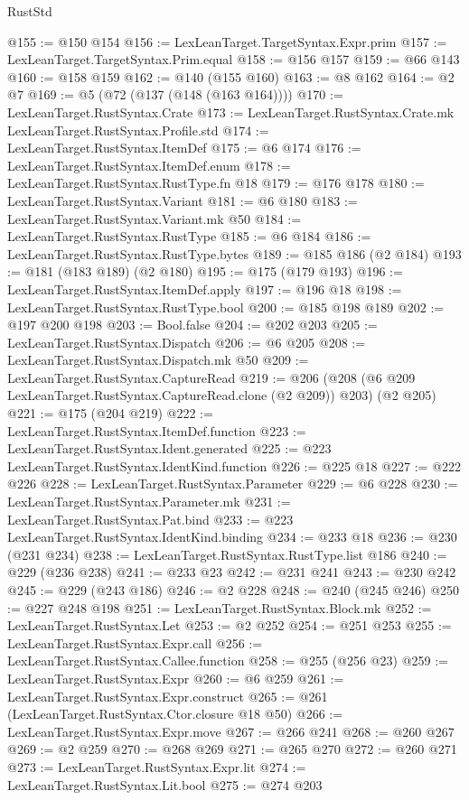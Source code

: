 \begin{lexlean}{RustStd}
\begin{coremodule}
@155 := @150 @154
@156 := LexLeanTarget.TargetSyntax.Expr.prim
@157 := LexLeanTarget.TargetSyntax.Prim.equal
@158 := @156 @157
@159 := @66 @143
@160 := @158 @159
@162 := @140 (@155 @160)
@163 := @8 @162
@164 := @2 @7
@169 := @5 (@72 (@137 (@148 (@163 @164))))
@170 := LexLeanTarget.RustSyntax.Crate
@173 := LexLeanTarget.RustSyntax.Crate.mk LexLeanTarget.RustSyntax.Profile.std
@174 := LexLeanTarget.RustSyntax.ItemDef
@175 := @6 @174
@176 := LexLeanTarget.RustSyntax.ItemDef.enum
@178 := LexLeanTarget.RustSyntax.RustType.fn @18
@179 := @176 @178
@180 := LexLeanTarget.RustSyntax.Variant
@181 := @6 @180
@183 := LexLeanTarget.RustSyntax.Variant.mk @50
@184 := LexLeanTarget.RustSyntax.RustType
@185 := @6 @184
@186 := LexLeanTarget.RustSyntax.RustType.bytes
@189 := @185 @186 (@2 @184)
@193 := @181 (@183 @189) (@2 @180)
@195 := @175 (@179 @193)
@196 := LexLeanTarget.RustSyntax.ItemDef.apply
@197 := @196 @18
@198 := LexLeanTarget.RustSyntax.RustType.bool
@200 := @185 @198 @189
@202 := @197 @200 @198
@203 := Bool.false
@204 := @202 @203
@205 := LexLeanTarget.RustSyntax.Dispatch
@206 := @6 @205
@208 := LexLeanTarget.RustSyntax.Dispatch.mk @50
@209 := LexLeanTarget.RustSyntax.CaptureRead
@219 := @206 (@208 (@6 @209 LexLeanTarget.RustSyntax.CaptureRead.clone (@2 @209)) @203) (@2 @205)
@221 := @175 (@204 @219)
@222 := LexLeanTarget.RustSyntax.ItemDef.function
@223 := LexLeanTarget.RustSyntax.Ident.generated
@225 := @223 LexLeanTarget.RustSyntax.IdentKind.function
@226 := @225 @18
@227 := @222 @226
@228 := LexLeanTarget.RustSyntax.Parameter
@229 := @6 @228
@230 := LexLeanTarget.RustSyntax.Parameter.mk
@231 := LexLeanTarget.RustSyntax.Pat.bind
@233 := @223 LexLeanTarget.RustSyntax.IdentKind.binding
@234 := @233 @18
@236 := @230 (@231 @234)
@238 := LexLeanTarget.RustSyntax.RustType.list @186
@240 := @229 (@236 @238)
@241 := @233 @23
@242 := @231 @241
@243 := @230 @242
@245 := @229 (@243 @186)
@246 := @2 @228
@248 := @240 (@245 @246)
@250 := @227 @248 @198
@251 := LexLeanTarget.RustSyntax.Block.mk
@252 := LexLeanTarget.RustSyntax.Let
@253 := @2 @252
@254 := @251 @253
@255 := LexLeanTarget.RustSyntax.Expr.call
@256 := LexLeanTarget.RustSyntax.Callee.function
@258 := @255 (@256 @23)
@259 := LexLeanTarget.RustSyntax.Expr
@260 := @6 @259
@261 := LexLeanTarget.RustSyntax.Expr.construct
@265 := @261 (LexLeanTarget.RustSyntax.Ctor.closure @18 @50)
@266 := LexLeanTarget.RustSyntax.Expr.move
@267 := @266 @241
@268 := @260 @267
@269 := @2 @259
@270 := @268 @269
@271 := @265 @270
@272 := @260 @271
@273 := LexLeanTarget.RustSyntax.Expr.lit
@274 := LexLeanTarget.RustSyntax.Lit.bool
@275 := @274 @203

\end{coremodule}
\end{lexlean}
